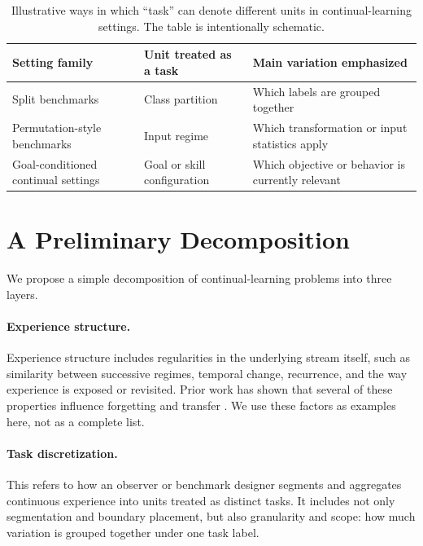 \documentclass{article} %
\begin{document}
\begin{table}[H]
\centering
\small
\caption{Illustrative ways in which ``task'' can denote different units in continual-learning settings. The table is intentionally schematic.}
\label{tab:task-meanings}
\begin{tabularx}{\linewidth}{@{}lXl@{}}
\toprule
Setting family & Unit treated as a task & Main variation emphasized \\
\midrule
Split benchmarks & Class partition & Which labels are grouped together \\
Permutation-style benchmarks & Input regime & Which transformation or input statistics apply \\
Goal-conditioned continual settings & Goal or skill configuration & Which objective or behavior is currently relevant \\
\bottomrule
\end{tabularx}
\end{table}


\section{A Preliminary Decomposition}
We propose a simple decomposition of continual-learning problems into three layers.

\paragraph{Experience structure.}
Experience structure includes regularities in the underlying stream itself, such as similarity between successive regimes, temporal change, recurrence, and the way experience is exposed or revisited. Prior work has shown that several of these properties influence forgetting and transfer \citep{bell2022effect,doan2021theoretical,hiratani2024disentangling,lin2023theory,li2025optimal,ramasesh2020anatomy}. We use these factors as examples here, not as a complete list.


\paragraph{Task discretization.}
This refers to how an observer or benchmark designer segments and aggregates continuous experience into units treated as distinct tasks. It includes not only segmentation and boundary placement, but also granularity and scope: how much variation is grouped together under one task label.
\end{document}
